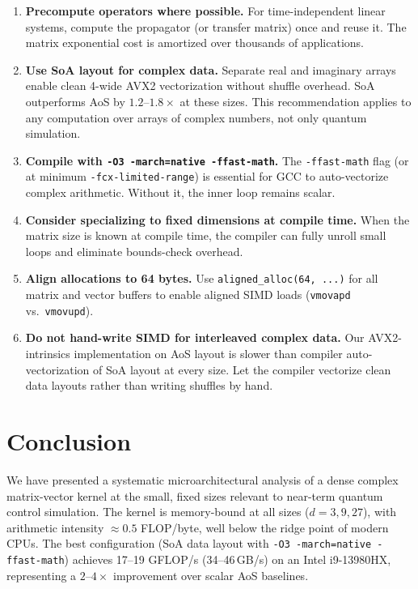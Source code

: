 \documentclass[final,3p,times,twocolumn]{elsarticle}
\begin{document}
\begin{enumerate}
  \item \textbf{Precompute operators where possible.}
        For time-independent linear systems, compute the propagator (or
        transfer matrix) once and reuse it. The matrix exponential cost
        is amortized over thousands of applications.

  \item \textbf{Use SoA layout for complex data.}
        Separate real and imaginary arrays enable clean 4-wide AVX2
        vectorization without shuffle overhead. SoA outperforms AoS by
        $1.2$--$1.8\times$ at these sizes. This recommendation applies
        to any computation over arrays of complex numbers, not only
        quantum simulation.

  \item \textbf{Compile with \texttt{-O3 -march=native -ffast-math}.}
        The \texttt{-ffast-math} flag (or at minimum
        \texttt{-fcx-limited-range}) is essential for GCC to
        auto-vectorize complex arithmetic. Without it, the inner loop
        remains scalar.

  \item \textbf{Consider specializing to fixed dimensions at compile time.}
        When the matrix size is known at compile time, the compiler can
        fully unroll small loops and eliminate bounds-check overhead.

  \item \textbf{Align allocations to 64 bytes.}
        Use \texttt{aligned\_alloc(64, ...)} for all matrix and vector
        buffers to enable aligned SIMD loads (\texttt{vmovapd} vs.\
        \texttt{vmovupd}).

  \item \textbf{Do not hand-write SIMD for interleaved complex data.}
        Our AVX2-intrinsics implementation on AoS layout is slower than
        compiler auto-vectorization of SoA layout at every size. Let the
        compiler vectorize clean data layouts rather than writing shuffles
        by hand.
\end{enumerate}

\section{Conclusion}
\label{sec:conclusion}

We have presented a systematic microarchitectural analysis of a dense
complex matrix-vector kernel at the small, fixed sizes relevant to
near-term quantum control simulation. The kernel is memory-bound at all
sizes ($d = 3, 9, 27$), with arithmetic intensity $\approx 0.5$
FLOP/byte, well below the ridge point of modern CPUs. The best
configuration (SoA data layout with \texttt{-O3 -march=native -ffast-math})
achieves 17--19 GFLOP/s (34--46\,GB/s) on an Intel i9-13980HX,
representing a $2$--$4\times$ improvement over scalar AoS baselines.
\end{document}
